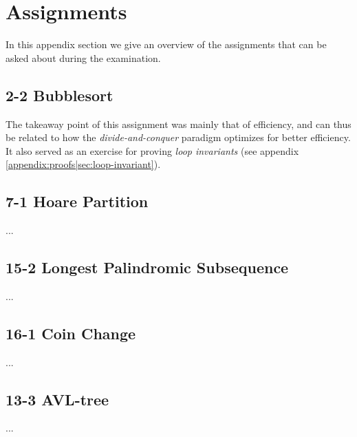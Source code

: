 
\thispagestyle{fancyplain}

\chapter{Assignments}
\label{appendix:assignments}
In this appendix section we give an overview of the assignments that can be
asked about during the examination.

\section{2-2 Bubblesort}
\label{appendix:assignments|ass:bubblesort}
The takeaway point of this assignment was mainly that of efficiency, and can
thus be related to how the \textit{divide-and-conquer} paradigm optimizes for
better efficiency. It also served as an exercise for proving \textit{loop
invariants} (see appendix \ref{appendix:proofs|sec:loop-invariant}).

\section{7-1 Hoare Partition}
\label{appendix:assignments|ass:hoare-partition}
...

\section{15-2 Longest Palindromic Subsequence}
\label{appendix:assignments|ass:longest-palindromic-subsequence}
...

\section{16-1 Coin Change}
\label{appendix:assignments|ass:coin-change}
...

\section{13-3 AVL-tree}
\label{appendix:assignments|ass:avl-tree}
...